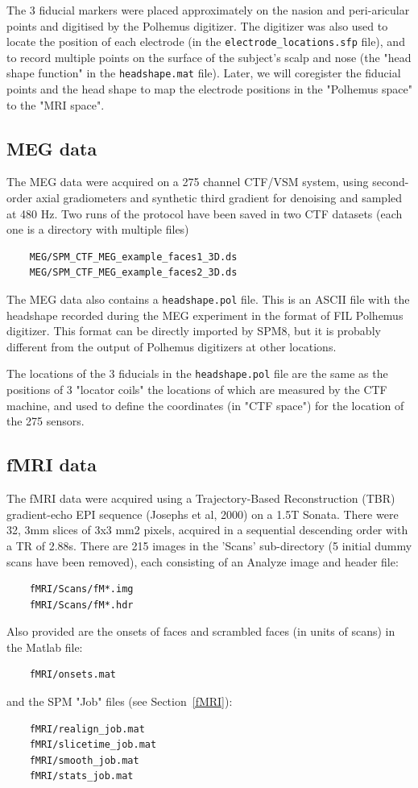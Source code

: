 The 3 fiducial markers were placed approximately on the nasion and peri-aricular points and digitised by the Polhemus digitizer. The digitizer was also used to locate the position of each electrode (in the \verb!electrode_locations.sfp! file), and to record multiple points on the surface of the  subject's scalp and nose (the "head shape function" in the \verb!headshape.mat! file). Later, we will coregister the fiducial points and the head shape to map the electrode positions in the "Polhemus space" to the "MRI space".

\subsection{MEG data \label{meg}}

The MEG data were acquired on a 275 channel CTF/VSM system, using second-order axial gradiometers and synthetic third gradient for denoising and sampled at 480 Hz. Two runs of the protocol have been saved in two CTF datasets (each one is a directory with multiple files) 
\begin{verbatim}
    MEG/SPM_CTF_MEG_example_faces1_3D.ds
    MEG/SPM_CTF_MEG_example_faces2_3D.ds
\end{verbatim}
The MEG data also contains a \verb!headshape.pol! file. This is an ASCII file with the headshape recorded during the MEG experiment in the format of FIL Polhemus digitizer. This format can be directly imported by SPM8, but it is probably different from the output of Polhemus digitizers at other locations.

The locations of the 3 fiducials in the \verb!headshape.pol! file are the same as the positions of 3 "locator coils" the locations of which are measured by the CTF machine, and used to define the coordinates (in "CTF space") for the location of the 275 sensors.

\subsection{fMRI data}

The fMRI data were acquired using a Trajectory-Based Reconstruction (TBR) gradient-echo EPI sequence (Josephs et al, 2000) on a 1.5T Sonata. There were 32, 3mm slices of 3x3 mm2 pixels, acquired in a sequential descending order with a TR of 2.88s. There are 215 images in the 'Scans' sub-directory (5 initial dummy scans have been removed), each consisting of an Analyze image and header file:
\begin{verbatim}
    fMRI/Scans/fM*.img  
    fMRI/Scans/fM*.hdr
\end{verbatim}
Also provided are the onsets of faces and scrambled faces (in units of scans) in the Matlab file:
\begin{verbatim}
    fMRI/onsets.mat 
\end{verbatim}
and the SPM "Job" files (see Section~\ref{fMRI}):
\begin{verbatim}
    fMRI/realign_job.mat
    fMRI/slicetime_job.mat
    fMRI/smooth_job.mat
    fMRI/stats_job.mat
\end{verbatim}

